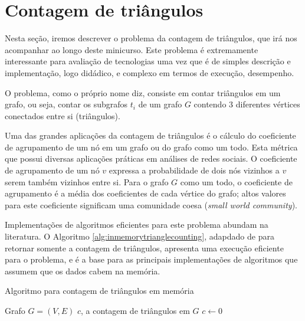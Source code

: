 \section{Contagem de triângulos} \label{triangulos}

Nesta seção, iremos descrever o problema da contagem de triângulos, que irá nos acompanhar
ao longo deste minicurso. Este problema é extremamente interessante para avaliação de 
tecnologias uma vez que é de simples descrição e implementação, logo didádico, e complexo
em termos de execução, desempenho.

O problema, como o próprio nome diz, consiste em contar triângulos em um grafo, ou seja,
contar os subgrafos $t_i$ de um grafo $G$ contendo 3 diferentes vértices conectados entre si 
(triângulos). 

Uma das grandes aplicações da contagem de triângulos é o cálculo do coeficiente de agrupamento 
de um nó em um grafo ou do grafo como um todo. Esta métrica que possui diversas aplicações práticas 
em análises de redes sociais. O coeficiente de agrupamento de um nó $v$ expressa a probabilidade de 
dois nós vizinhos a $v$ serem também vizinhos entre si. Para o grafo $G$ como um todo, o coeficiente 
de agrupamento é a média dos coeficientes de cada vértice do grafo; altos valores para este coeficiente 
significam uma comunidade coesa (\emph{small world community}).

Implementações de algoritmos eficientes para este problema abundam na literatura. O Algoritmo 
\ref{alg:inmemorytrianglecounting}, adapdado de \cite{Chu2012} para retornar somente a contagem de 
triângulos, apresenta uma execução eficiente para o problema, e é a base para as principais 
implementações de algoritmos que assumem que os dados cabem na memória. 

\begin{algorithm}
\caption{Algoritmo para contagem de triângulos em memória}
\label{alg:inmemorytrianglecounting}
\begin{algorithmic}[1]
    \REQUIRE Grafo $G = (V, E)$
    \ENSURE $c$, a contagem de triângulos em $G$
    \STATE $c \leftarrow 0$
            \ENDFOR
        \ENDFOR
    \ENDFOR 
\end{algorithmic}
\end{algorithm}

